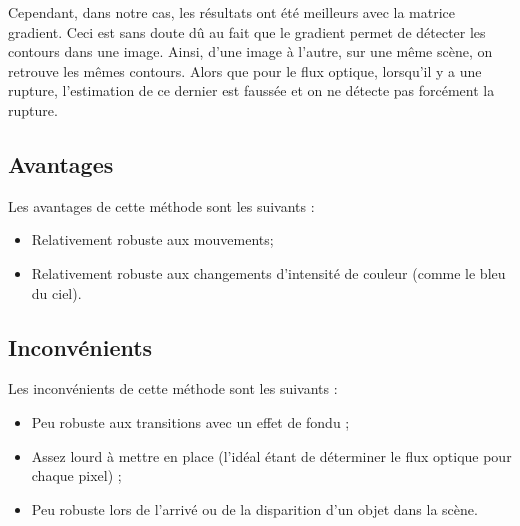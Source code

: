 Cependant, dans notre cas, les résultats ont été meilleurs avec la matrice gradient. Ceci est sans doute dû au fait que le gradient permet de détecter les contours dans une image. Ainsi, d'une image à l'autre, sur une même scène, on retrouve les mêmes contours. Alors que pour le flux optique, lorsqu'il y a une rupture, l'estimation de ce dernier est faussée et on ne détecte pas forcément la rupture.

\subsection{Avantages}

Les avantages de cette méthode sont les suivants :

\begin{itemize}
	\item Relativement robuste aux mouvements;
	\item Relativement robuste aux changements d'intensité de couleur (comme le bleu du ciel).
\end{itemize}

\subsection{Inconvénients}

Les inconvénients de cette méthode sont les suivants :

\begin{itemize}
	\item Peu robuste aux transitions avec un effet de fondu ;
	\item Assez lourd à mettre en place (l'idéal étant de déterminer le flux optique pour chaque pixel) ;
	\item Peu robuste lors de l'arrivé ou de la disparition d'un objet dans la scène.
\end{itemize}
